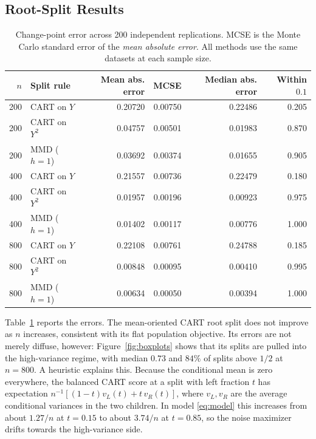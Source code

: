\documentclass[12pt,a4paper]{article}
\newcommand{\1}{\mathbf 1}
\begin{document}
\subsection{Root-Split Results}\label{sec:results}
\begin{table}[htbp]
\centering\small
\caption{Change-point error across 200 independent replications. MCSE is the Monte Carlo standard error of the \emph{mean absolute error}. All methods use the same datasets at each sample size.}
\label{tab:simulation}
\begin{tabular}{@{}rlrrrr@{}}
\toprule
$n$ & Split rule & Mean abs. error & MCSE & Median abs. error & Within $0.1$ \\
\midrule
200 & CART on $Y$ & 0.20720 & 0.00750 & 0.22486 & 0.205 \\
200 & CART on $Y^2$ & 0.04757 & 0.00501 & 0.01983 & 0.870 \\
200 & MMD ($h=1$) & 0.03692 & 0.00374 & 0.01655 & 0.905 \\
400 & CART on $Y$ & 0.21557 & 0.00736 & 0.22479 & 0.180 \\
400 & CART on $Y^2$ & 0.01957 & 0.00196 & 0.00923 & 0.975 \\
400 & MMD ($h=1$) & 0.01402 & 0.00117 & 0.00776 & 1.000 \\
800 & CART on $Y$ & 0.22108 & 0.00761 & 0.24788 & 0.185 \\
800 & CART on $Y^2$ & 0.00848 & 0.00095 & 0.00410 & 0.995 \\
800 & MMD ($h=1$) & 0.00634 & 0.00050 & 0.00394 & 1.000 \\
\bottomrule
\end{tabular}
\end{table}

Table~\ref{tab:simulation} reports the errors. The mean-oriented CART root split does not improve as $n$ increases, consistent with its flat population objective. Its errors are not merely diffuse, however: Figure~\ref{fig:boxplots} shows that its splits are pulled into the high-variance regime, with median $0.73$ and $84\%$ of splits above $1/2$ at $n=800$. A heuristic explains this. Because the conditional mean is zero everywhere, the balanced CART score at a split with left fraction $t$ has expectation $n^{-1}[(1-t)v_L(t)+t\,v_R(t)]$, where $v_L,v_R$ are the average conditional variances in the two children. In model \eqref{eq:model} this increases from about $1.27/n$ at $t=0.15$ to about $3.74/n$ at $t=0.85$, so the noise maximizer drifts towards the high-variance side.
\end{document}

